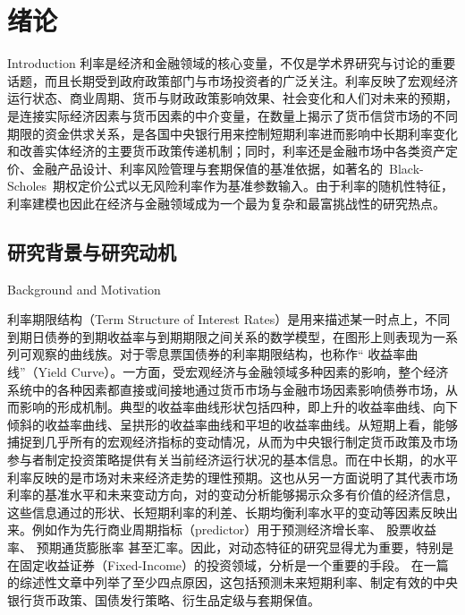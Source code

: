
\chapter{绪论}{Introduction}
\label{chap01}
利率是经济和金融领域的核心变量，不仅是学术界研究与讨论的重要话题，而且长期受到政府政策部门与市场投资者的广泛关注。利率反映了宏观经济运行状态、商业周期、货币与财政政策影响效果、社会变化和人们对未来的预期，是连接实际经济因素与货币因素的中介变量，在数量上揭示了货币信贷市场的不同期限的资金供求关系，是各国中央银行用来控制短期利率进而影响中长期利率变化和改善实体经济的主要货币政策传递机制；同时，利率还是金融市场中各类资产定价、金融产品设计、利率风险管理与套期保值的基准依据，如著名的~Black-Scholes~期权定价公式以无风险利率作为基准参数输入。由于利率的随机性特征，利率建模也因此在经济与金融领域成为一个最为复杂和最富挑战性的研究热点\citep{gibson2010modeling}。

\section{研究背景与研究动机}{Background and Motivation}

利率期限结构（Term Structure of Interest Rates）是用来描述某一时点上，不同到期日债券的到期收益率与到期期限之间关系的数学模型，在图形上则表现为一系列可观察的曲线族。对于零息票国债券的利率期限结构，也称作`` 收益率曲线''（Yield Curve）。一方面，\ts 受宏观经济与金融领域多种因素的影响，整个经济系统中的各种因素都直接或间接地通过货币市场与金融市场因素影响债券市场，从而影响\ts 的形成机制。典型的收益率曲线形状包括四种，即上升的收益率曲线、向下倾斜的收益率曲线、呈拱形的收益率曲线和平坦的收益率曲线。从短期上看，\yc 能够捕捉到几乎所有的宏观经济指标的变动情况\citep{ang2003no,monch2008forecasting}，从而为中央银行制定货币政策及市场参与者制定投资策略提供有关当前经济运行状况的基本信息。而在中长期，\yc 的水平利率反映的是市场对未来经济走势的理性预期。这也从另一方面说明了其代表市场利率的基准水平和未来变动方向，对\ts 的变动分析能够揭示众多有价值的经济信息，这些信息通过\yc 的形状、长短期利率的利差、长期均衡利率水平的变动等因素反映出来。例如\ts 作为先行商业周期指标（predictor）用于预测经济增长率\citep{harvey1993term}、 股票收益率\citep{campbell1987stock,cochrane2005bond}、 预期通货膨胀率
\citep{fama1990term}甚至汇率\citep{clarida2003out}。因此，对\ts 动态特征的研究显得尤为重要，特别是在固定收益证券（Fixed-Income）的投资领域，\ts 分析是一个重要的手段。 在一篇\ts 的综述性文章中列举了至少四点原因，这包括预测未来短期利率、制定有效的中央银行货币政策、国债发行策略、衍生品定级与套期保值。

